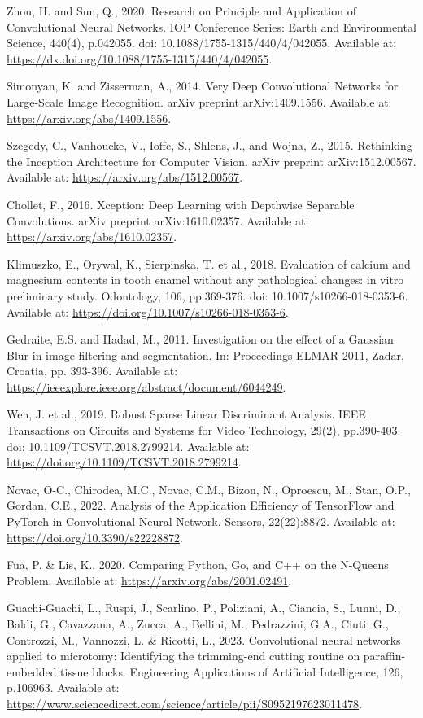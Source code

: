 \begin{thebibliography}{99}
    Zhou, H. and Sun, Q., 2020. Research on Principle and Application of Convolutional Neural Networks. IOP Conference Series: Earth and Environmental Science, 440(4), p.042055. doi: 10.1088/1755-1315/440/4/042055. Available at: \url{https://dx.doi.org/10.1088/1755-1315/440/4/042055}.

    Simonyan, K. and Zisserman, A., 2014. Very Deep Convolutional Networks for Large-Scale Image Recognition. arXiv preprint arXiv:1409.1556. Available at: \url{https://arxiv.org/abs/1409.1556}.
    
    Szegedy, C., Vanhoucke, V., Ioffe, S., Shlens, J., and Wojna, Z., 2015. Rethinking the Inception Architecture for Computer Vision. arXiv preprint arXiv:1512.00567. Available at: \url{https://arxiv.org/abs/1512.00567}.
    
    Chollet, F., 2016. Xception: Deep Learning with Depthwise Separable Convolutions. arXiv preprint arXiv:1610.02357. Available at: \url{https://arxiv.org/abs/1610.02357}.

    Klimuszko, E., Orywal, K., Sierpinska, T. et al., 2018. Evaluation of calcium and magnesium contents in tooth enamel without any pathological changes: in vitro preliminary study. Odontology, 106, pp.369-376. doi: 10.1007/s10266-018-0353-6. Available at: \url{https://doi.org/10.1007/s10266-018-0353-6}.

    Gedraite, E.S. and Hadad, M., 2011. Investigation on the effect of a Gaussian Blur in image filtering and segmentation. In: Proceedings ELMAR-2011, Zadar, Croatia, pp. 393-396. Available at: \url{https://ieeexplore.ieee.org/abstract/document/6044249}.

    Wen, J. et al., 2019. Robust Sparse Linear Discriminant Analysis. IEEE Transactions on Circuits and Systems for Video Technology, 29(2), pp.390-403. doi: 10.1109/TCSVT.2018.2799214. Available at: \url{https://doi.org/10.1109/TCSVT.2018.2799214}.

    Novac, O-C., Chirodea, M.C., Novac, C.M., Bizon, N., Oproescu, M., Stan, O.P., Gordan, C.E., 2022. Analysis of the Application Efficiency of TensorFlow and PyTorch in Convolutional Neural Network. Sensors, 22(22):8872. Available at: \url{https://doi.org/10.3390/s22228872}.

    Fua, P. \& Lis, K., 2020. Comparing Python, Go, and C++ on the N-Queens Problem. Available at: \url{https://arxiv.org/abs/2001.02491}.

    Guachi-Guachi, L., Ruspi, J., Scarlino, P., Poliziani, A., Ciancia, S., Lunni, D., Baldi, G., Cavazzana, A., Zucca, A., Bellini, M., Pedrazzini, G.A., Ciuti, G., Controzzi, M., Vannozzi, L. \& Ricotti, L., 2023. Convolutional neural networks applied to microtomy: Identifying the trimming-end cutting routine on paraffin-embedded tissue blocks. Engineering Applications of Artificial Intelligence, 126, p.106963. Available at: \url{https://www.sciencedirect.com/science/article/pii/S0952197623011478}.
    
\end{thebibliography}